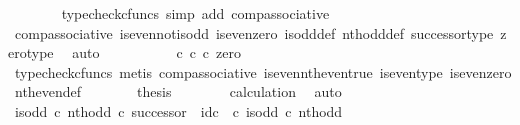 \begin{isabellebody}
\ \ \ \ \ \ \isamarkupfalse%
\ {\isacharparenleft}{\kern0pt}typecheck{\isacharunderscore}{\kern0pt}cfuncs{\isacharcomma}{\kern0pt}\ simp\ add{\isacharcolon}{\kern0pt}\ comp{\isacharunderscore}{\kern0pt}associative{}{\isacharparenright}{\kern0pt}\isanewline
\ \ \ \ \isamarkupfalse%
\ \isamarkupfalse%
\ {\isachardoublequoteopen}{\isachardot}{\kern0pt}{\isachardot}{\kern0pt}{\isachardot}{\kern0pt}\ {\isacharequal}{\kern0pt}\ {\isasymt}{\isachardoublequoteclose}\isanewline
\ \ \ \ \ \ \isamarkupfalse%
\ comp{\isacharunderscore}{\kern0pt}associative{}\ is{\isacharunderscore}{\kern0pt}even{\isacharunderscore}{\kern0pt}not{\isacharunderscore}{\kern0pt}is{\isacharunderscore}{\kern0pt}odd\ is{\isacharunderscore}{\kern0pt}even{\isacharunderscore}{\kern0pt}zero\ is{\isacharunderscore}{\kern0pt}odd{\isacharunderscore}{\kern0pt}def{}\ nth{\isacharunderscore}{\kern0pt}odd{\isacharunderscore}{\kern0pt}def{}\ successor{\isacharunderscore}{\kern0pt}type\ zero{\isacharunderscore}{\kern0pt}type\ \isamarkupfalse%
\ auto\isanewline
\ \ \ \ \isamarkupfalse%
\ \isamarkupfalse%
\ {\isachardoublequoteopen}{\isachardot}{\kern0pt}{\isachardot}{\kern0pt}{\isachardot}{\kern0pt}\ {\isacharequal}{\kern0pt}\ {\isacharparenleft}{\kern0pt}{\isasymt}\ {\isasymcirc}\isactrlsub c\ {\isasymbeta}\isactrlbsub {\isasymnat}\isactrlsub c\isactrlesub {\isacharparenright}{\kern0pt}\ {\isasymcirc}\isactrlsub c\ zero{\isachardoublequoteclose}\isanewline
\ \ \ \ \ \ \isamarkupfalse%
\ {\isacharparenleft}{\kern0pt}typecheck{\isacharunderscore}{\kern0pt}cfuncs{\isacharcomma}{\kern0pt}\ metis\ comp{\isacharunderscore}{\kern0pt}associative{}\ is{\isacharunderscore}{\kern0pt}even{\isacharunderscore}{\kern0pt}nth{\isacharunderscore}{\kern0pt}even{\isacharunderscore}{\kern0pt}true\ is{\isacharunderscore}{\kern0pt}even{\isacharunderscore}{\kern0pt}type\ is{\isacharunderscore}{\kern0pt}even{\isacharunderscore}{\kern0pt}zero\ nth{\isacharunderscore}{\kern0pt}even{\isacharunderscore}{\kern0pt}def{}{\isacharparenright}{\kern0pt}\isanewline
\ \ \ \ \isamarkupfalse%
\ \isamarkupfalse%
\ {\isacharquery}{\kern0pt}thesis\isanewline
\ \ \ \ \ \ \isamarkupfalse%
\ calculation\ \isamarkupfalse%
\ auto\isanewline
\ \ \isamarkupfalse%
\isanewline
\isanewline
\ \ \isamarkupfalse%
\ {\isachardoublequoteopen}{\isacharparenleft}{\kern0pt}is{\isacharunderscore}{\kern0pt}odd\ {\isasymcirc}\isactrlsub c\ nth{\isacharunderscore}{\kern0pt}odd{\isacharparenright}{\kern0pt}\ {\isasymcirc}\isactrlsub c\ successor\ {\isacharequal}{\kern0pt}\ id\isactrlsub c\ {\isasymOmega}\ {\isasymcirc}\isactrlsub c\ is{\isacharunderscore}{\kern0pt}odd\ {\isasymcirc}\isactrlsub c\ nth{\isacharunderscore}{\kern0pt}odd{\isachardoublequoteclose}\isanewline

\end{isabellebody}
